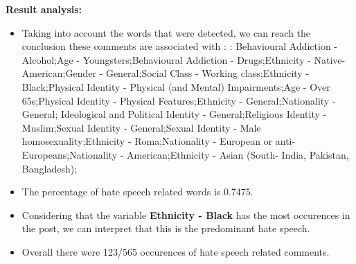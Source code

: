 \documentclass[11pt]{article}
\begin{document}
\textbf{\Large Result analysis:}

\begin{itemize}\item Taking into account the words that were detected, we can reach the conclusion these comments are associated with : : Behavioural Addiction - Alcohol;Age - Youngsters;Behavioural Addiction - Drugs;Ethnicity - Native-American;Gender - General;Social Class - Working class;Ethnicity - Black;Physical Identity - Physical (and Mental) Impairments;Age - Over 65s;Physical Identity - Physical Features;Ethnicity - General;Nationality - General; Ideological and Political Identity - General;Religious Identity - Muslim;Sexual Identity - General;Sexual Identity - Male homosexuality;Ethnicity - Roma;Nationality - European or anti-Europeans;Nationality - American;Ethnicity - Asian (South- India, Pakistan, Bangladesh);%

\item The percentage of hate speech related words is 0.7475.

\item Considering that the variable \textbf{Ethnicity - Black} has the most occurences in the post, we can interpret that this is the predominant hate speech.

\item Overall there were 123/565 occurences of hate speech related comments.\end{itemize}
\end{document}
